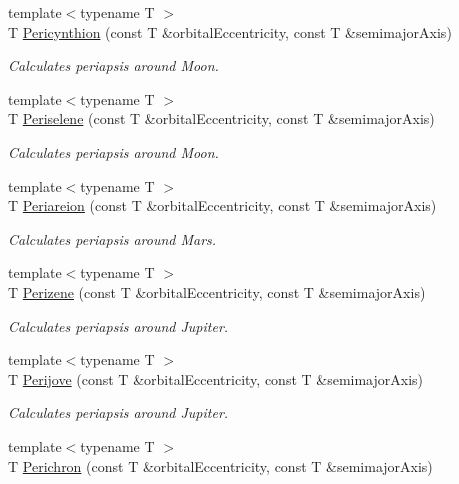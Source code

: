 \begin{DoxyCompactItemize}
{\footnotesize template$<$typename T $>$ }\\T \hyperlink{group___periapsis_gaeeba153b188cd06cbd233eaef12f0a6a}{Pericynthion} (const T \&orbital\+Eccentricity, const T \&semimajor\+Axis)
\begin{DoxyCompactList}\small\item\em Calculates periapsis around Moon. \end{DoxyCompactList}\item 
{\footnotesize template$<$typename T $>$ }\\T \hyperlink{group___periapsis_ga255874374dde571531e443cdbef9ef0c}{Periselene} (const T \&orbital\+Eccentricity, const T \&semimajor\+Axis)
\begin{DoxyCompactList}\small\item\em Calculates periapsis around Moon. \end{DoxyCompactList}\item 
{\footnotesize template$<$typename T $>$ }\\T \hyperlink{group___periapsis_ga0617ba07a30b0fd0544c02f691bfae26}{Periareion} (const T \&orbital\+Eccentricity, const T \&semimajor\+Axis)
\begin{DoxyCompactList}\small\item\em Calculates periapsis around Mars. \end{DoxyCompactList}\item 
{\footnotesize template$<$typename T $>$ }\\T \hyperlink{group___periapsis_ga0523c65b7fc26e675388b2c3d38aa00b}{Perizene} (const T \&orbital\+Eccentricity, const T \&semimajor\+Axis)
\begin{DoxyCompactList}\small\item\em Calculates periapsis around Jupiter. \end{DoxyCompactList}\item 
{\footnotesize template$<$typename T $>$ }\\T \hyperlink{group___periapsis_ga075052f7ff9aa1d5fdf4501b493be86b}{Perijove} (const T \&orbital\+Eccentricity, const T \&semimajor\+Axis)
\begin{DoxyCompactList}\small\item\em Calculates periapsis around Jupiter. \end{DoxyCompactList}\item 
{\footnotesize template$<$typename T $>$ }\\T \hyperlink{group___periapsis_ga12b5e99aa2e3e7031ef6ce93060cf516}{Perichron} (const T \&orbital\+Eccentricity, const T \&semimajor\+Axis)

\end{DoxyCompactItemize}
